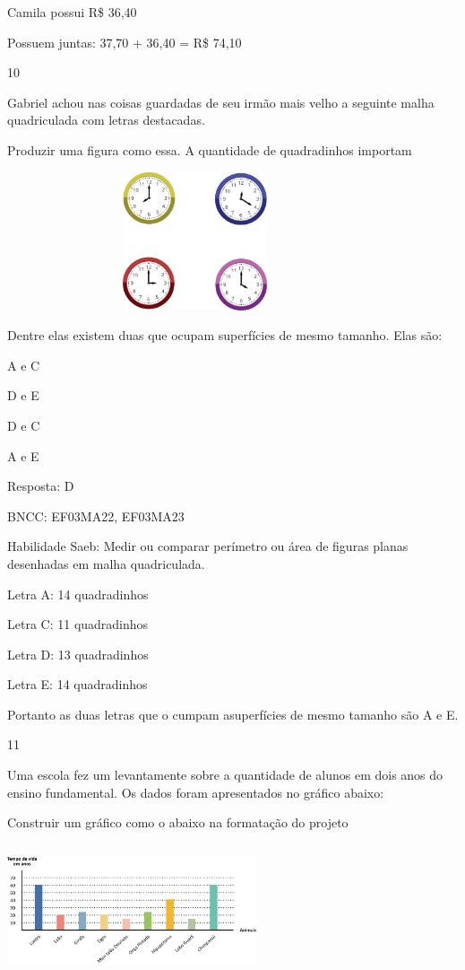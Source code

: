 \begin{escolha}
{\begin{escolha}
{Camila possui R\$ 36,40

Possuem juntas: 37,70 + 36,40 = R\$ 74,10

\num{10}

Gabriel achou nas coisas guardadas de seu irmão mais velho a seguinte
malha quadriculada com letras destacadas.

Produzir uma figura como essa. A quantidade de quadradinhos importam

\includegraphics[width=4.36538in,height=1.60417in]{media/image111.png}

Dentre elas existem duas que ocupam superfícies de mesmo tamanho. Elas
são:

\begin{escolha}
\item
  A e C
\item
  D e E
\item
  D e C
\item
  A e E
\end{escolha}

Resposta: D

BNCC: EF03MA22, EF03MA23

Habilidade Saeb: Medir ou comparar perímetro ou área de figuras planas
desenhadas em malha quadriculada.

Letra A: 14 quadradinhos

Letra C: 11 quadradinhos

Letra D: 13 quadradinhos

Letra E: 14 quadradinhos

Portanto as duas letras que o cumpam asuperfícies de mesmo tamanho são A
e E.

\num{11}

Uma escola fez um levantamente sobre a quantidade de alunos em dois anos
do ensino fundamental. Os dados foram apresentados no gráfico abaixo:

Construir um gráfico como o abaixo na formatação do projeto

\includegraphics[width=2.89744in,height=1.52156in]{media/image112.png}

}
\end{escolha}}
\end{escolha}
